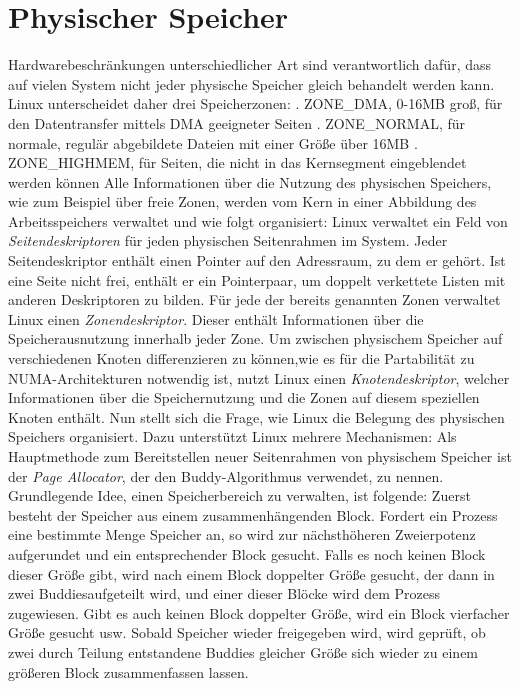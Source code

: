 \documentclass[11pt,a4paper]{article}
\begin{document}
\section*{Physischer Speicher}
Hardwarebeschränkungen unterschiedlicher Art sind verantwortlich dafür, dass auf vielen System nicht jeder physische Speicher gleich behandelt werden kann. Linux unterscheidet daher drei Speicherzonen:
. ZONE\_DMA, 0-16MB groß, für den Datentransfer mittels DMA geeigneter Seiten 
. ZONE\_NORMAL, für normale, regulär abgebildete Dateien mit einer Größe über 16MB
. ZONE\_HIGHMEM, für Seiten, die nicht in das Kernsegment eingeblendet werden können
\newline
\newline
Alle Informationen über die Nutzung des physischen Speichers, wie zum Beispiel über freie Zonen, werden vom Kern in einer Abbildung des Arbeitsspeichers verwaltet und wie folgt organisiert: 
\newline
Linux verwaltet ein Feld von \textit{Seitendeskriptoren} für jeden physischen Seitenrahmen im System. Jeder Seitendeskriptor enthält einen Pointer auf den Adressraum, zu dem er gehört. Ist eine Seite nicht frei, enthält er ein Pointerpaar, um doppelt verkettete Listen mit anderen Deskriptoren zu bilden. 
Für jede der bereits genannten Zonen verwaltet Linux einen \textit{Zonendeskriptor}. Dieser enthält Informationen über die Speicherausnutzung innerhalb jeder Zone.
Um zwischen physischem Speicher auf verschiedenen Knoten differenzieren zu können,wie es für die Partabilität zu NUMA-Architekturen notwendig ist, nutzt Linux einen \textit{Knotendeskriptor}, welcher Informationen über die Speichernutzung und die Zonen auf diesem speziellen Knoten enthält. 
\newline
\newline
Nun stellt sich die Frage, wie Linux die Belegung des physischen Speichers organisiert. Dazu unterstützt Linux mehrere Mechanismen:
\newline
Als Hauptmethode zum Bereitstellen neuer Seitenrahmen von physischem Speicher ist der \textit{Page Allocator}, der den Buddy-Algorithmus verwendet, zu nennen.
Grundlegende Idee, einen Speicherbereich zu verwalten, ist folgende: Zuerst besteht der Speicher aus einem zusammenhängenden Block. Fordert ein Prozess eine bestimmte Menge Speicher an, so wird zur nächsthöheren Zweierpotenz aufgerundet und ein entsprechender Block gesucht. Falls es noch keinen Block dieser Größe gibt, wird nach einem Block doppelter Größe gesucht, der dann in zwei \glqq Buddies\grqq  aufgeteilt wird, und einer dieser Blöcke wird dem Prozess zugewiesen. Gibt es auch keinen Block doppelter Größe, wird ein Block vierfacher Größe gesucht usw. Sobald Speicher wieder freigegeben wird, wird geprüft, ob zwei durch Teilung entstandene Buddies gleicher Größe sich wieder zu einem größeren Block zusammenfassen lassen. 
\end{document}
